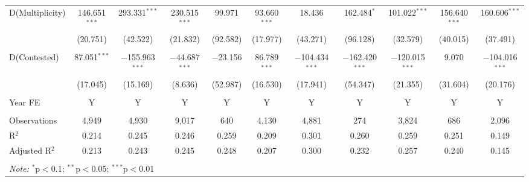 \begin{landscape}
\begin{table}
{\begin{tabular}{lcccccccccc}
 D(Multiplicity) & 146.651$^{***}$ & 293.331$^{***}$ & 230.515$^{***}$ & 99.971 & 93.660$^{***}$ & 18.436 & 162.484$^{*}$ & 101.022$^{***}$ & 156.640$^{***}$ & 160.606$^{***}$ \\ 
 & (20.751) & (42.522) & (21.832) & (92.582) & (17.977) & (43.271) & (96.128) & (32.579) & (40.015) & (37.491) \\ 
 & & & & & & & & & & \\ 
 D(Contested) & 87.051$^{***}$ & $-$155.963$^{***}$ & $-$44.687$^{***}$ & $-$23.156 & 86.789$^{***}$ & $-$104.434$^{***}$ & $-$162.420$^{***}$ & $-$120.015$^{***}$ & 9.070 & $-$104.016$^{***}$ \\ 
 & (17.045) & (15.169) & (8.636) & (52.987) & (16.530) & (17.941) & (54.347) & (21.355) & (31.604) & (20.176) \\
 \hline \\[-1.8ex]
 Year FE & Y & Y & Y & Y & Y & Y & Y & Y & Y & Y \\
 \hline \\[-1.8ex] 
 Observations & 4,949 & 4,930 & 9,017 & 640 & 4,130 & 4,881 & 274 & 3,824 & 686 & 2,096 \\ 
 R$^{2}$ & 0.214 & 0.245 & 0.246 & 0.259 & 0.209 & 0.301 & 0.260 & 0.259 & 0.251 & 0.149 \\ 
 Adjusted R$^{2}$ & 0.213 & 0.243 & 0.245 & 0.248 & 0.207 & 0.300 & 0.232 & 0.257 & 0.240 & 0.145 \\ 
 \hline \\[-1.8ex] 
 \multicolumn{11}{l}{\textit{Note:} $^{*}$p$<$0.1; $^{**}$p$<$0.05; $^{***}$p$<$0.01} \\ 
 \end{tabular}}
 \end{table}
 \end{landscape}

